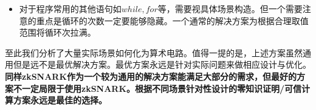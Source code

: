 \documentclass[12pt]{article}
\newcommand{\zk}{zkSNARK}
\newcommand{\pp}{$\mathcal{P}$}
\begin{document}
\begin{itemize}
\begin{itemize}
     解决方案：强行还原出$a$的绝对值：引入变量及限制$c=a\cdot a, b\cdot b =c$，$b$在合理范围内（$b \in [0,2^{32})$）。对$b$按照上面方案（判断条件$a=0$）构造证明。

       Pinocchio（参考资料[1]）给出了更为巧妙的构造。上述$b=(a!=0)?1:0$的取值可以仅由两个方程决定：
     $$a(1-b)=0, aM-b=0$$
     其中$M$为\pp 提供的新变量。显然，如果$a\neq 0$则$b$一定为1，且$M$能够置为$M=1/a$使上式成立。反之如果$a=0$则$b$也一定为0，$M$可以为任何数。

     \item   $$if~~a>0~~then~~\mbox{表达式1}~~else~~\mbox{表达式2}$$
     需要已知限定条件：$a$的绝对值在合理范围内。

     注意到我们仍然不能暴露$a$是否大于0。笔者能想到的一个解决方案如下：

     （如上）构造$c=a\cdot a, b \cdot b =c$，$b$在合理范围内（$b \in [0,2^{32})$），即$b=|a|$

     (如上)构造$c_1= (a!=b)?1:0$，对应$a<0$的情形，$c_2= (-a!=b)?1:0$，对应$a>0$的情形。（注意到此时只有$\pm a=b$两种情形）

     注意到，此时还有$a=0$的情形，对应$c_1,c_2$都等于0。我们再引入$c_3= (a=0)?1:0$

     构造$d=c_2\mbox{表达式1}+c_1\mbox{表达式2}+c_3\mbox{表达式2}$
  	\end{itemize}
    至此大部分判断函数已经解决。
    \item 对于程序常用的其他语句如$while,for$等，需要视具体场景构造。但一个需要注意的重点是循环的次数一定要能够隐藏。一个通常的解决方案为根据合理取值范围将循环次拉满。
\end{itemize}
至此我们分析了大量实际场景如何化为算术电路。值得一提的是，上述方案虽然通用但是远不是最优解决方案。最优方案永远是针对实际问题来做相应设计与优化。\textbf{同样\zk 作为一个较为通用的解决方案能满足大部分的需求，但最好的方案不一定局限于使用\zk。根据不同场景针对性设计的零知识证明/可信计算方案永远是最佳的选择。}



\newpage
\begin{appendices}
%
\end{appendices}
\end{document}
